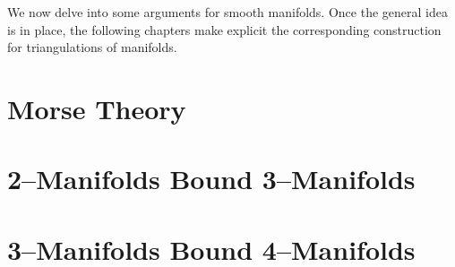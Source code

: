 \label{cha:cobordisms}

We now delve into some arguments for smooth manifolds.
Once the general idea is in place, the following chapters make explicit the corresponding construction for triangulations of manifolds.

\section{Morse Theory}


\section{2--Manifolds Bound 3--Manifolds}


\section{3--Manifolds Bound 4--Manifolds}


%
